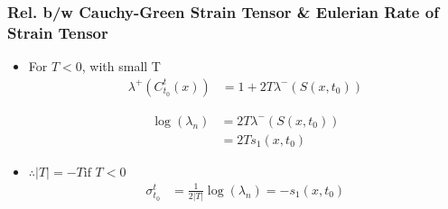\documentclass[../presentation.tex]{subfiles}
\begin{document}
\begin{frame}
  \frametitle{\small Rel. b/w Cauchy-Green Strain Tensor \& Eulerian Rate of Strain Tensor}

  \begin{itemize}
    \item For \(T < 0\), with small T
    \begin{equation}
      \begin{aligned}
        \lambda^+ (C_{t_0}^t(x)) &= 1 + 2T \lambda^- (S(x, t_0))
      \end{aligned}
    \end{equation}
    
    \begin{equation}
      \begin{aligned}
        \log(\lambda_n) &= 2T\lambda^- (S(x, t_0)) \\
        &= 2Ts_1(x, t_0)
      \end{aligned}
    \end{equation}

    \item \(\therefore |T| = -T \text{if } T < 0\)
    \begin{equation}
      \begin{aligned}
        \sigma_{t_0}^t &= \frac{1}{2|T|} \log(\lambda_n) = -s_1(x, t_0)
      \end{aligned}
    \end{equation}
  \end{itemize}
\end{frame}
\end{document}
